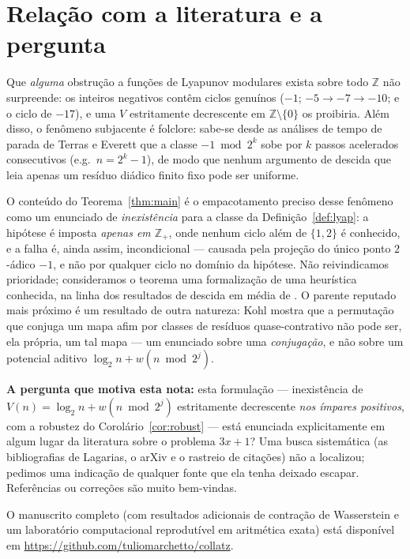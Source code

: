 \documentclass[10pt]{amsart}
\theoremstyle{definition}
\theoremstyle{remark}
\newcommand{\Z}{\mathbb{Z}}
\begin{document}
\section{Relação com a literatura e a pergunta}

Que \emph{alguma} obstrução a funções de Lyapunov modulares exista sobre todo $\Z$ não surpreende: os inteiros negativos contêm ciclos genuínos ($-1$; $-5 \to -7 \to -10$; e o ciclo de $-17$), e uma $V$ estritamente decrescente em $\Z\setminus\{0\}$ os proibiria. Além disso, o fenômeno subjacente é folclore: sabe-se desde as análises de tempo de parada de Terras \cite{terras1976} e Everett \cite{everett1977} que a classe $-1 \bmod 2^k$ sobe por $k$ passos acelerados consecutivos (e.g.\ $n = 2^k-1$), de modo que nenhum argumento de descida que leia apenas um resíduo diádico finito fixo pode ser uniforme.

O conteúdo do Teorema~\ref{thm:main} é o empacotamento preciso desse fenômeno como um enunciado de \emph{inexistência} para a classe da Definição~\ref{def:lyap}: a hipótese é imposta \emph{apenas em $\Z_+$}, onde nenhum ciclo além de $\{1,2\}$ é conhecido, e a falha é, ainda assim, incondicional --- causada pela projeção do único ponto $2$-ádico $-1$, e não por qualquer ciclo no domínio da hipótese. Não reivindicamos prioridade; consideramos o teorema uma formalização de uma heurística conhecida, na linha dos resultados de descida em média de \cite{terras1976,tao2022}. O parente reputado mais próximo é um resultado de outra natureza: Kohl \cite{kohl2008} mostra que a permutação que conjuga um mapa afim por classes de resíduos quase-contrativo não pode ser, ela própria, um tal mapa --- um enunciado sobre uma \emph{conjugação}, e não sobre um potencial aditivo $\log_2 n + w(n\bmod 2^j)$.

\textbf{A pergunta que motiva esta nota:} esta formulação --- inexistência de $V(n)=\log_2 n + w(n \bmod 2^j)$ estritamente decrescente \emph{nos ímpares positivos}, com a robustez do Corolário~\ref{cor:robust} --- está enunciada explicitamente em algum lugar da literatura sobre o problema $3x+1$? Uma busca sistemática (as bibliografias de Lagarias, o arXiv e o rastreio de citações) não a localizou; pedimos uma indicação de qualquer fonte que ela tenha deixado escapar. Referências ou correções são muito bem-vindas.

O manuscrito completo (com resultados adicionais de contração de Wasserstein e um laboratório computacional reprodutível em aritmética exata) está disponível em \url{https://github.com/tuliomarchetto/collatz}.
\end{document}
